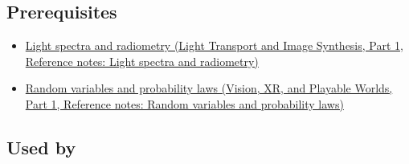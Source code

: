 \subsection{Prerequisites}\label{appendix-4815cd87ab8b-prerequisites}

\hypertarget{appendix-4815cd87ab8b-prerequisites}{}

\begin{itemize}
\tightlist
\item
  \href{../04-Light-Transport-and-Image-Synthesis-P01/main.pdf\#appendix-215c2570199b}{Light spectra and radiometry (Light Transport and Image Synthesis, Part 1, Reference notes: Light spectra and radiometry)}
\item
  \href{../07-Vision-XR-and-Playable-Worlds-P01/main.pdf\#appendix-4d0203f7944f}{Random variables and probability laws (Vision, XR, and Playable Worlds, Part 1, Reference notes: Random variables and probability laws)}
\end{itemize}

\subsection{Used by}\label{appendix-4815cd87ab8b-used-by}

\hypertarget{appendix-4815cd87ab8b-used-by}{}

